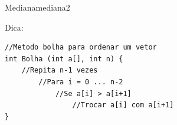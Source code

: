 \documentclass[12pt,a4paper,oneside]{article}
\begin{document}
\begin{problem}{Mediana}{mediana}{2}

\vspace{12pt}
Dica:

\begin{lstlisting}
//Metodo bolha para ordenar um vetor
int Bolha (int a[], int n) {
    //Repita n-1 vezes
        //Para i = 0 ... n-2
            //Se a[i] > a[i+1]
                //Trocar a[i] com a[i+1]
}
\end{lstlisting}


\end{problem}
\end{document}
